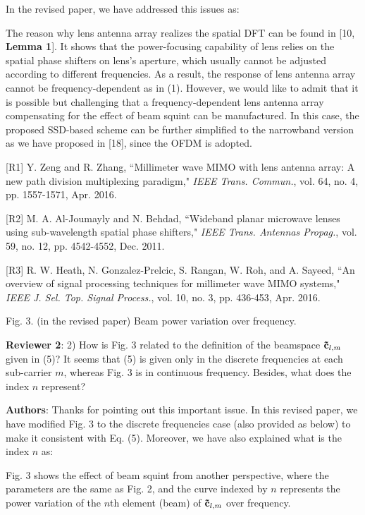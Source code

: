 \documentclass[a4paper,12pt]{article}
\begin{document}
{In the revised paper, we have addressed this issues as:
\begin{framed}
{\color{red} The reason why lens antenna array realizes the spatial DFT can be found in [10, \textbf{Lemma 1}]. It shows that the power-focusing capability of lens relies on the spatial phase shifters on lens's aperture, which usually cannot be adjusted according to different frequencies. As a result, the response of lens antenna array cannot be frequency-dependent as in (1). However, we would like to admit that it is possible but challenging that a frequency-dependent lens antenna array compensating for the effect of beam squint can be manufactured. In this case, the proposed SSD-based scheme can be further simplified to the narrowband version as we have proposed in [18], since the OFDM is adopted.}
\end{framed}


[R1] Y. Zeng and R. Zhang, ``Millimeter wave MIMO with lens antenna array: A new path division multiplexing paradigm," {\it IEEE Trans. Commun.}, vol. 64, no. 4, pp. 1557-1571, Apr. 2016.

[R2] M. A. Al-Joumayly and N. Behdad, ``Wideband planar microwave lenses using sub-wavelength spatial phase shifters," {\it IEEE Trans. Antennas Propag.}, vol. 59, no. 12, pp. 4542-4552, Dec. 2011.

[R3] R. W. Heath, N. Gonzalez-Prelcic, S. Rangan, W. Roh, and A. Sayeed, ``An overview of signal processing techniques for millimeter wave MIMO systems," {\it IEEE J. Sel. Top. Signal Process.}, vol. 10, no. 3, pp. 436-453, Apr. 2016.


Fig. 3. (in the revised paper) Beam power variation over frequency.

}

\textbf{Reviewer 2}: 2) How is Fig. 3 related to the definition of the beamspace ${{{\bf{\tilde c}}_{l,m}}}$ given in (5)? It seems that (5) is given only in the discrete frequencies at each sub-carrier ${m}$, whereas Fig. 3 is in continuous frequency. Besides, what does the index ${n}$ represent?

{\color{blue} \textbf{Authors}: Thanks for pointing out this important issue. In this revised paper, we have modified Fig. 3 to the discrete frequencies case (also provided as below) to make it consistent with Eq. (5). Moreover, we have also explained what is the index ${n}$ as:


\begin{framed}
{\color{red} Fig. 3 shows the effect of beam squint from another perspective, where the parameters are the same as Fig. 2, and the curve indexed by ${n}$ represents the power variation of the ${n}$th element (beam) of ${{{\bf{\tilde c}}_{l,m}}}$  over frequency.}
\end{framed}




}
\end{document}
